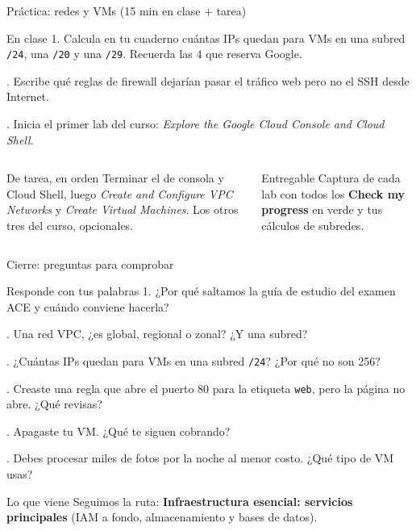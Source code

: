 \documentclass[aspectratio=169,10pt,c]{beamer}
\begin{document}
\begin{frame}{Práctica: redes y VMs \textnormal{\small(15 min en clase + tarea)}}
\begin{block}{En clase}
\small
1. Calcula en tu cuaderno cuántas IPs quedan para VMs en una subred \texttt{/24}, una \texttt{/20} y una \texttt{/29}. Recuerda las 4 que reserva Google.\par{}. Escribe qué reglas de firewall dejarían pasar el tráfico web pero no el SSH desde Internet.\par{}. Inicia el primer lab del curso: \emph{Explore the Google Cloud Console and Cloud Shell}.
\end{block}
\begin{columns}[T,onlytextwidth]
\begin{exampleblock}{De tarea, en orden}
\small Terminar el de consola y Cloud Shell, luego \emph{Create and Configure VPC Networks} y \emph{Create Virtual Machines}. Los otros tres del curso, opcionales.
\end{exampleblock}
\begin{alertblock}{Entregable}
\small Captura de cada lab con todos los \textbf{Check my progress} en verde y tus cálculos de subredes.
\end{alertblock}
\end{columns}
\end{frame}

\begin{frame}{Cierre: preguntas para comprobar}
\begin{block}{Responde con tus palabras}
\small
1. ¿Por qué saltamos la guía de estudio del examen ACE y cuándo conviene hacerla?\par{}. Una red VPC, ¿es global, regional o zonal? ¿Y una subred?\par{}. ¿Cuántas IPs quedan para VMs en una subred \texttt{/24}? ¿Por qué no son 256?\par{}. Creaste una regla que abre el puerto 80 para la etiqueta \texttt{web}, pero la página no abre. ¿Qué revisas?\par{}. Apagaste tu VM. ¿Qué te siguen cobrando?\par{}. Debes procesar miles de fotos por la noche al menor costo. ¿Qué tipo de VM usas?
\end{block}
\begin{alertblock}{Lo que viene}
\small Seguimos la ruta: \textbf{Infraestructura esencial: servicios principales} (IAM a fondo, almacenamiento y bases de datos).
\end{alertblock}
\end{frame}
\end{document}
